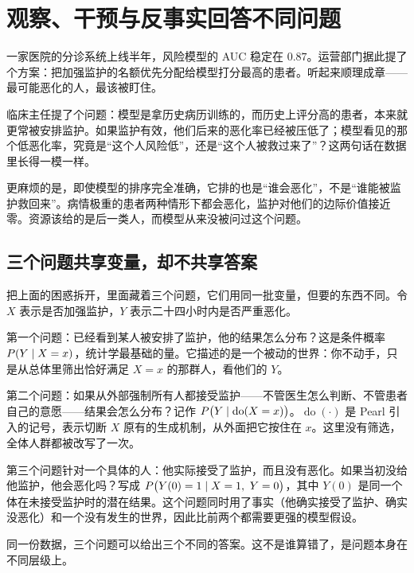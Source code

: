 \section{观察、干预与反事实回答不同问题}
\label{sec:13-Machine-Learning/12-Causal-Inference/01}

一家医院的分诊系统上线半年，风险模型的 AUC 稳定在 \(0.87\)。运营部门据此提了个方案：把加强监护的名额优先分配给模型打分最高的患者。听起来顺理成章——最可能恶化的人，最该被盯住。

临床主任提了个问题：模型是拿历史病历训练的，而历史上评分高的患者，本来就更常被安排监护。如果监护有效，他们后来的恶化率已经被压低了；模型看见的那个低恶化率，究竟是``这个人风险低''，还是``这个人被救过来了''？这两句话在数据里长得一模一样。

更麻烦的是，即使模型的排序完全准确，它排的也是``谁会恶化''，不是``谁能被监护救回来''。病情极重的患者两种情形下都会恶化，监护对他们的边际价值接近零。资源该给的是后一类人，而模型从来没被问过这个问题。

\subsection{三个问题共享变量，却不共享答案}

把上面的困惑拆开，里面藏着三个问题，它们用同一批变量，但要的东西不同。令 \(X\) 表示是否加强监护，\(Y\) 表示二十四小时内是否严重恶化。

第一个问题：已经看到某人被安排了监护，他的结果怎么分布？这是条件概率 \(P(Y\mid X=x)\)，统计学最基础的量。它描述的是一个被动的世界：你不动手，只是从总体里筛出恰好满足 \(X=x\) 的那群人，看他们的 \(Y\)。

第二个问题：如果从外部强制所有人都接受监护——不管医生怎么判断、不管患者自己的意愿——结果会怎么分布？记作 \(P\bigl(Y\mid \operatorname{do}(X=x)\bigr)\)。\(\operatorname{do}(\cdot)\) 是 Pearl 引入的记号，表示切断 \(X\) 原有的生成机制，从外面把它按住在 \(x\)。这里没有筛选，全体人群都被改写了一次。

第三个问题针对一个具体的人：他实际接受了监护，而且没有恶化。如果当初没给他监护，他会恶化吗？写成 \(P\bigl(Y(0)=1\given X=1,\ Y=0\bigr)\)，其中 \(Y(0)\) 是同一个体在未接受监护时的潜在结果。这个问题同时用了事实（他确实接受了监护、确实没恶化）和一个没有发生的世界，因此比前两个都需要更强的模型假设。

同一份数据，三个问题可以给出三个不同的答案。这不是谁算错了，是问题本身在不同层级上。

